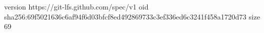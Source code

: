 version https://git-lfs.github.com/spec/v1
oid sha256:69f5021636c6af94f6d03bfcf8ed492869733c3ef336ed6c3241f458a1720d73
size 69
